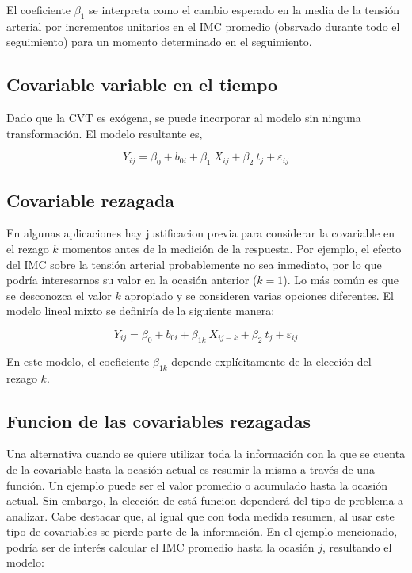 \documentclass[spanish]{article}
\numberwithin{figure}{subsection}
\numberwithin{equation}{subsection}
\numberwithin{table}{subsection}
\begin{document}
El coeficiente $\beta_1$ se interpreta como el cambio esperado en la media de la
tensión arterial por incrementos unitarios en el IMC promedio (obsrvado durante
todo el seguimiento) para un momento determinado en el seguimiento.

\subsection{Covariable variable en el tiempo}

Dado que la CVT es exógena, se puede incorporar al modelo sin ninguna
transformación. El modelo resultante es,

\[ Y_{ij} = \beta_0 + b_{0i} + \beta_1\ X_{ij} + \beta_2\ t_j + \varepsilon_{ij} \]


\subsection{Covariable rezagada}

En algunas aplicaciones hay justificacion previa para considerar la covariable
en el rezago $k$ momentos antes de la medición de la respuesta. Por ejemplo, el
efecto del IMC sobre la tensión arterial probablemente no sea inmediato, por lo
que podría interesarnos su valor en la ocasión anterior ($k=1$). Lo más común es
que se desconozca el valor $k$ apropiado y se consideren varias opciones
diferentes. El modelo lineal mixto se definiría de la siguiente manera:

\[ Y_{ij} = \beta_0 + b_{0i} + \beta_{1k}\ X_{ij-k} + \beta_2\ t_j + \varepsilon_{ij} \]

En este modelo, el coeficiente $\beta_{1k}$ depende explícitamente de la
elección del rezago $k$.

\subsection{Funcion de las covariables rezagadas}

Una alternativa cuando se quiere utilizar toda la información con la que se
cuenta de la covariable hasta la ocasión actual es resumir la misma a través de
una función. Un ejemplo puede ser el valor promedio o acumulado hasta la ocasión
actual. Sin embargo, la elección de está funcion dependerá del tipo de problema
a analizar. Cabe destacar que, al igual que con toda medida resumen, al usar
este tipo de covariables se pierde parte de la información. En el ejemplo
mencionado, podría ser de interés calcular el IMC promedio hasta la ocasión $j$,
resultando el modelo:
\end{document}
